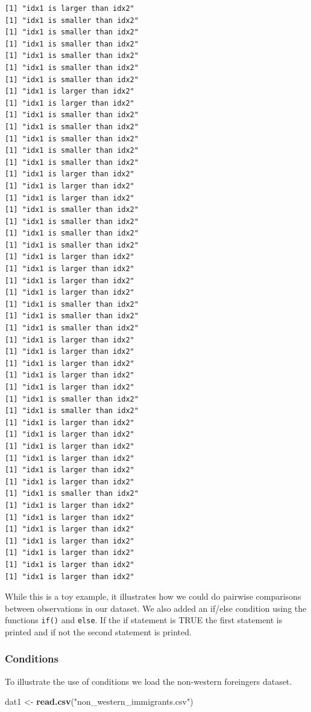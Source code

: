 \documentclass[]{article}
\newenvironment{Shaded}{\begin{snugshade}}{\end{snugshade}}
\newcommand{\KeywordTok}[1]{\textcolor[rgb]{0.13,0.29,0.53}{\textbf{#1}}}
\newcommand{\NormalTok}[1]{#1}
\newcommand{\StringTok}[1]{\textcolor[rgb]{0.31,0.60,0.02}{#1}}
\begin{document}
\begin{verbatim}
[1] "idx1 is larger than idx2"
[1] "idx1 is smaller than idx2"
[1] "idx1 is smaller than idx2"
[1] "idx1 is smaller than idx2"
[1] "idx1 is smaller than idx2"
[1] "idx1 is smaller than idx2"
[1] "idx1 is smaller than idx2"
[1] "idx1 is larger than idx2"
[1] "idx1 is larger than idx2"
[1] "idx1 is smaller than idx2"
[1] "idx1 is smaller than idx2"
[1] "idx1 is smaller than idx2"
[1] "idx1 is smaller than idx2"
[1] "idx1 is smaller than idx2"
[1] "idx1 is larger than idx2"
[1] "idx1 is larger than idx2"
[1] "idx1 is larger than idx2"
[1] "idx1 is smaller than idx2"
[1] "idx1 is smaller than idx2"
[1] "idx1 is smaller than idx2"
[1] "idx1 is smaller than idx2"
[1] "idx1 is larger than idx2"
[1] "idx1 is larger than idx2"
[1] "idx1 is larger than idx2"
[1] "idx1 is larger than idx2"
[1] "idx1 is smaller than idx2"
[1] "idx1 is smaller than idx2"
[1] "idx1 is smaller than idx2"
[1] "idx1 is larger than idx2"
[1] "idx1 is larger than idx2"
[1] "idx1 is larger than idx2"
[1] "idx1 is larger than idx2"
[1] "idx1 is larger than idx2"
[1] "idx1 is smaller than idx2"
[1] "idx1 is smaller than idx2"
[1] "idx1 is larger than idx2"
[1] "idx1 is larger than idx2"
[1] "idx1 is larger than idx2"
[1] "idx1 is larger than idx2"
[1] "idx1 is larger than idx2"
[1] "idx1 is larger than idx2"
[1] "idx1 is smaller than idx2"
[1] "idx1 is larger than idx2"
[1] "idx1 is larger than idx2"
[1] "idx1 is larger than idx2"
[1] "idx1 is larger than idx2"
[1] "idx1 is larger than idx2"
[1] "idx1 is larger than idx2"
[1] "idx1 is larger than idx2"
\end{verbatim}

While this is a toy example, it illustrates how we could do pairwise comparisons between observations in our dataset. We also added an if/else condition using the functions \texttt{if()} and \texttt{else}. If the if statement is TRUE the first statement is printed and if not the second statement is printed.

\hypertarget{conditions}{%
\subsubsection{Conditions}\label{conditions}}

To illustrate the use of conditions we load the non-western foreingers dataset.

\begin{Shaded}
\begin{Highlighting}[]
\NormalTok{dat1 <-}\StringTok{ }\KeywordTok{read.csv}\NormalTok{(}\StringTok{"non_western_immigrants.csv"}\NormalTok{)}
\end{Highlighting}
\end{Shaded}
\end{document}

